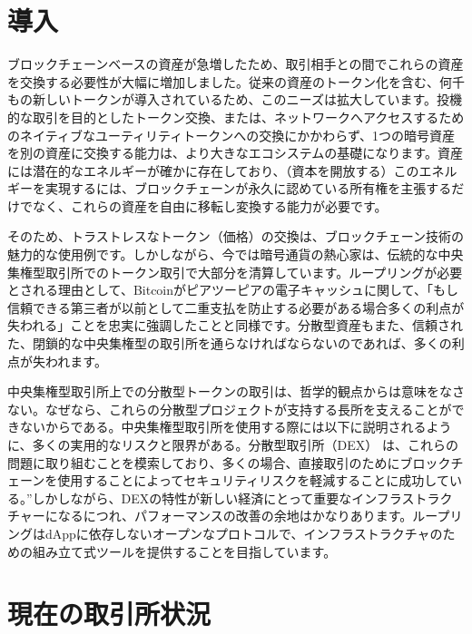 \documentclass{article}
\begin{document}
\begin{multicols}{2}
\section{導入\label{sec:introduction}}

ブロックチェーンベースの資産が急増したため、取引相手との間でこれらの資産を交換する必要性が大幅に増加しました。従来の資産のトークン化を含む、何千もの新しいトークンが導入されているため、このニーズは拡大しています。投機的な取引を目的としたトークン交換、または、ネットワークへアクセスするためのネイティブなユーティリティトークンへの交換にかかわらず、1つの暗号資産を別の資産に交換する能力は、より大きなエコシステムの基礎になります。資産には潜在的なエネルギーが確かに存在\cite{desotocapital}しており、（資本を開放する）このエネルギーを実現するには、ブロックチェーンが永久に認めている所有権を主張するだけでなく、これらの資産を自由に移転し変換する能力が必要です。
 
そのため、トラストレスなトークン（価格）の交換は、ブロックチェーン技術の魅力的な使用例です。しかしながら、今では暗号通貨の熱心家は、伝統的な中央集権型取引所でのトークン取引で大部分を清算しています。ループリングが必要とされる理由として、Bitcoin\cite{nakamoto2008bitcoin}がピアツーピアの電子キャッシュに関して、「もし信頼できる第三者が以前として二重支払を防止する必要がある場合多くの利点が失われる」ことを忠実に強調したことと同様です。分散型資産もまた、信頼された、閉鎖的な中央集権型の取引所を通らなければならないのであれば、多くの利点が失われます。

中央集権型取引所上での分散型トークンの取引は、哲学的観点からは意味をなさない。なぜなら、これらの分散型プロジェクトが支持する長所を支えることができないからである。中央集権型取引所を使用する際には以下に説明されるように、多くの実用的なリスクと限界がある。分散型取引所（DEX）\cite{schuh2015bitshares} \cite{bancor} \cite{kyber}は、これらの問題に取り組むことを模索しており、多くの場合、直接取引のためにブロックチェーンを使用することによってセキュリティリスクを軽減することに成功している。”しかしながら、DEXの特性が新しい経済にとって重要なインフラストラクチャーになるにつれ、パフォーマンスの改善の余地はかなりあります。ループリングはdAppに依存しないオープンなプロトコルで、インフラストラクチャのための組み立て式ツールを提供することを目指しています。

\section{現在の取引所状況\label{sec:current_exchange_landscape}}


\end{multicols}
\end{document}
